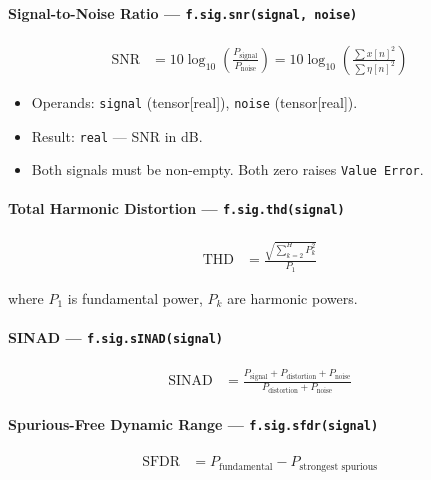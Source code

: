\paragraph{Signal-to-Noise Ratio --- \texttt{f.sig.snr(signal, noise)}}

\begin{align}
\text{SNR} &= 10 \log_{10}\left(\frac{P_{\text{signal}}}{P_{\text{noise}}}\right) = 10 \log_{10}\left(\frac{\sum x[n]^2}{\sum \eta[n]^2}\right) \label{eq:sig-snr}
\end{align}

\begin{itemize}
\item Operands: \texttt{signal} (tensor[real]), \texttt{noise} (tensor[real]).
\item Result: \texttt{real} --- SNR in dB.
\item Both signals must be non-empty. Both zero raises \texttt{Value Error}.
\end{itemize}

\paragraph{Total Harmonic Distortion --- \texttt{f.sig.thd(signal)}}

\begin{align}
\text{THD} &= \frac{\sqrt{\sum_{k=2}^{H} P_k^2}}{P_1} \label{eq:sig-thd}
\end{align}

where $P_1$ is fundamental power, $P_k$ are harmonic powers.

\paragraph{SINAD --- \texttt{f.sig.sINAD(signal)}}

\begin{align}
\text{SINAD} &= \frac{P_{\text{signal}} + P_{\text{distortion}} + P_{\text{noise}}}{P_{\text{distortion}} + P_{\text{noise}}} \label{eq:sig-sinad}
\end{align}

\paragraph{Spurious-Free Dynamic Range --- \texttt{f.sig.sfdr(signal)}}

\begin{align}
\text{SFDR} &= P_{\text{fundamental}} - P_{\text{strongest spurious}} \label{eq:sig-sfdr}
\end{align}

